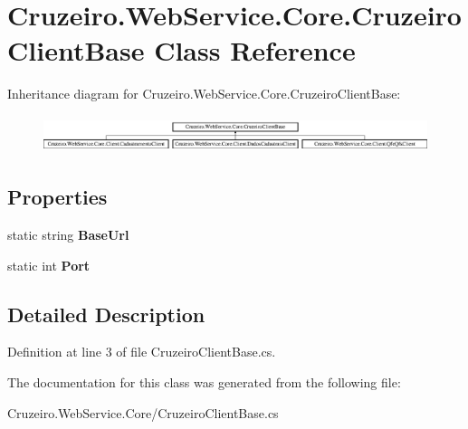 \hypertarget{class_cruzeiro_1_1_web_service_1_1_core_1_1_cruzeiro_client_base}{}\section{Cruzeiro.\+Web\+Service.\+Core.\+Cruzeiro\+Client\+Base Class Reference}
\label{class_cruzeiro_1_1_web_service_1_1_core_1_1_cruzeiro_client_base}
Inheritance diagram for Cruzeiro.\+Web\+Service.\+Core.\+Cruzeiro\+Client\+Base\+:\begin{figure}[H]
\begin{center}
\leavevmode
\includegraphics[height=1.091618cm]{class_cruzeiro_1_1_web_service_1_1_core_1_1_cruzeiro_client_base}
\end{center}
\end{figure}
\subsection*{Properties}
\begin{DoxyCompactItemize}
\item 
static string {\bfseries Base\+Url}\hypertarget{class_cruzeiro_1_1_web_service_1_1_core_1_1_cruzeiro_client_base_af785bebf128b81d71847ea8fa4f09cd0}{}\label{class_cruzeiro_1_1_web_service_1_1_core_1_1_cruzeiro_client_base_af785bebf128b81d71847ea8fa4f09cd0}

\item 
static int {\bfseries Port}\hypertarget{class_cruzeiro_1_1_web_service_1_1_core_1_1_cruzeiro_client_base_a3ab1662553f1abf2e6ec649cb0aba079}{}\label{class_cruzeiro_1_1_web_service_1_1_core_1_1_cruzeiro_client_base_a3ab1662553f1abf2e6ec649cb0aba079}

\end{DoxyCompactItemize}


\subsection{Detailed Description}


Definition at line 3 of file Cruzeiro\+Client\+Base.\+cs.



The documentation for this class was generated from the following file\+:\begin{DoxyCompactItemize}
\item 
Cruzeiro.\+Web\+Service.\+Core/Cruzeiro\+Client\+Base.\+cs\end{DoxyCompactItemize}
